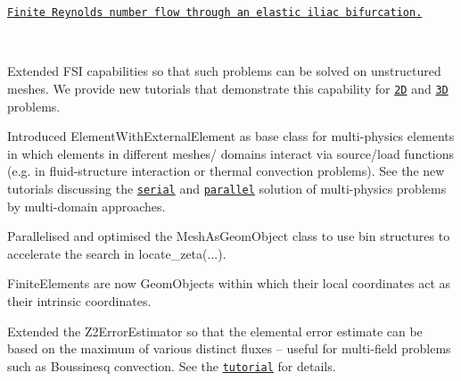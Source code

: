 \begin{DoxyItemize}
\begin{DoxyItemize}
\item \href{../../interaction/vmtk_fsi/html/index.html}{\tt Finite Reynolds number flow through an elastic iliac bifurcation.}
\end{DoxyItemize}~\newline
~\newline

\item Extended F\+SI capabilities so that such problems can be solved on unstructured meshes. We provide new tutorials that demonstrate this capability for \href{../../interaction/unstructured_fsi/html/index.html}{\tt 2D} and \href{../../interaction/unstructured_three_d_fsi/html/index.html}{\tt 3D} problems. ~\newline
~\newline

\item Introduced {\ttfamily Element\+With\+External\+Element} as base class for multi-\/physics elements in which elements in different meshes/ domains interact via source/load functions (e.\+g. in fluid-\/structure interaction or thermal convection problems). See the new tutorials discussing the \href{../../multi_physics/multi_domain_ref_b_convect/html/index.html}{\tt serial} and \href{../../mpi/boussinesq_convection/html/index.html}{\tt parallel} solution of multi-\/physics problems by multi-\/domain approaches. ~\newline
~\newline

\item Parallelised and optimised the {\ttfamily Mesh\+As\+Geom\+Object} class to use bin structures to accelerate the search in {\ttfamily locate\+\_\+zeta}(...). ~\newline
~\newline

\item {\ttfamily Finite\+Elements} are now {\ttfamily Geom\+Objects} within which their local coordinates act as their intrinsic coordinates. ~\newline
~\newline

\item Extended the {\ttfamily Z2\+Error\+Estimator} so that the elemental error estimate can be based on the maximum of various distinct fluxes -- useful for multi-\/field problems such as Boussinesq convection. See the \href{../../multi_physics/refine_b_convect/html/index.html#comments}{\tt tutorial} for details. ~\newline
~\newline


\end{DoxyItemize}
